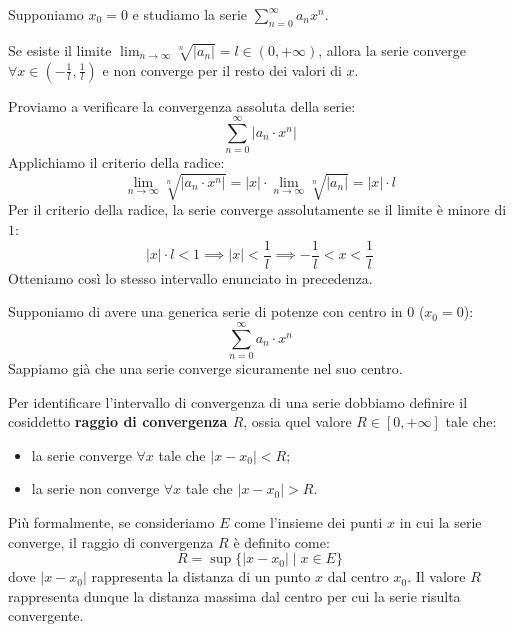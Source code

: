 \documentclass[12pt]{report}
\begin{document}
	Supponiamo $x_0 = 0$ e studiamo la serie $\sum_{n=0}^{\infty} a_n x^n$.
	
	\begin{proposizione}{}{}
		
		Se esiste il limite $\lim_{n \to \infty} \sqrt[n]{|a_n|} = l \in (0, +\infty)$, allora la serie converge $\forall x \in \left(-\frac{1}{l}, \frac{1}{l}\right)$ e non converge per il resto dei valori di $x$.
		
	\end{proposizione}
	
	\begin{dimostrazione}{}{}
		
		Proviamo a verificare la convergenza assoluta della serie:
		\[
		\sum_{n=0}^{\infty} |a_n \cdot x^n|
		\]
		Applichiamo il criterio della radice:
		\[
		\lim_{n \to \infty} \sqrt[n]{|a_n \cdot x^n|} = |x| \cdot \lim_{n \to \infty} \sqrt[n]{|a_n|} = |x| \cdot l
		\]
		Per il criterio della radice, la serie converge assolutamente se il limite è minore di $1$:
		\[
		|x| \cdot l < 1 \implies |x| < \frac{1}{l} \implies -\frac{1}{l} < x < \frac{1}{l}
		\]
		Otteniamo così lo stesso intervallo enunciato in precedenza.
		
	\end{dimostrazione}
	
	Supponiamo di avere una generica serie di potenze con centro in $0$ ($x_0 = 0$):
	\[
	\sum_{n=0}^{\infty} a_n \cdot x^n
	\]
	Sappiamo già che una serie converge sicuramente nel suo centro.
	
	Per identificare l'intervallo di convergenza di una serie dobbiamo definire il cosiddetto \textbf{raggio di convergenza $R$}, ossia quel valore $R \in [0, +\infty]$ tale che:
	\begin{itemize}
		
		\item la serie converge $\forall x$ tale che $|x - x_0| < R$;
		
		\item la serie non converge $\forall x$ tale che $|x - x_0| > R$.
		
	\end{itemize}
	
	Più formalmente, se consideriamo $E$ come l'insieme dei punti $x$ in cui la serie converge, il raggio di convergenza $R$ è definito come:
	\[
	R = \sup \{ |x - x_0| \mid x \in E \}
	\]
	dove $|x - x_0|$ rappresenta la distanza di un punto $x$ dal centro $x_0$. Il valore $R$ rappresenta dunque la distanza massima dal centro per cui la serie risulta convergente.
	
\end{document}
